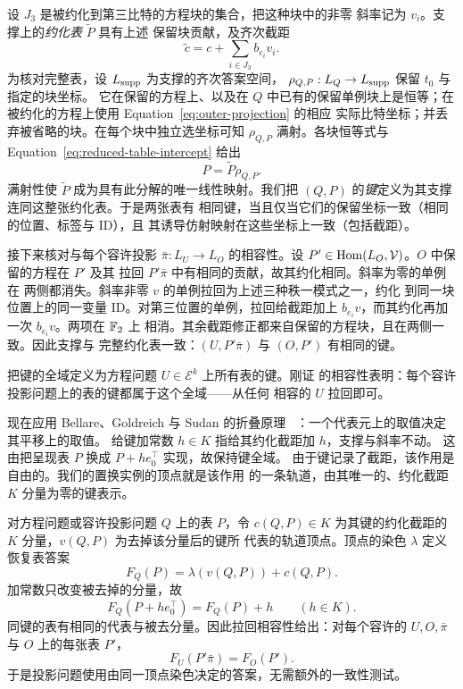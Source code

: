 设 \(J_3\) 是被约化到第三比特的方程块的集合，把这种块中的非零
斜率记为 \(v_i\)。支撑上的\emph{约化表} \(\widetilde P\) 具有上述
保留块贡献，及齐次截距
\begin{equation}
 \widetilde c=c+\sum_{i\in J_3} b_{e_i}v_i.
 \label{eq:reduced-table-intercept}
\end{equation}
为核对完整表，设 \(L_{\rm supp}\) 为支撑的齐次答案空间，
\(\rho_{Q,P}:L_Q\to L_{\rm supp}\) 保留 \(t_0\) 与指定的块坐标。
它在保留的方程上、以及在 \(Q\) 中已有的保留单例块上是恒等；在
被约化的方程上使用 Equation~\eqref{eq:outer-projection} 的相应
实际比特坐标；并丢弃被省略的块。在每个块中独立选坐标可知
\(\rho_{Q,P}\) 满射。各块恒等式与
Equation~\eqref{eq:reduced-table-intercept} 给出
\[
 P=\widetilde P\rho_{Q,P}.
\]
满射性使 \(\widetilde P\) 成为具有此分解的唯一线性映射。我们把
\((Q,P)\) 的\emph{键}定义为其支撑连同这整张约化表。于是两张表有
相同键，当且仅当它们的保留坐标一致（相同的位置、标签与 ID），且
其诱导仿射映射在这些坐标上一致（包括截距）。

接下来核对与每个容许投影 \(\bar\pi:L_U\to L_O\) 的相容性。设
\(P'\in\operatorname{Hom}(L_O,\mathcal V)\)。\(O\) 中保留的方程在 \(P'\) 及其
拉回 \(P'\bar\pi\) 中有相同的贡献，故其约化相同。斜率为零的单例在
两侧都消失。斜率非零 \(v\) 的单例拉回为上述三种秩一模式之一，约化
到同一块位置上的同一变量 ID。对第三位置的单例，拉回给截距加上
\(b_{e_i}v\)，而其约化再加一次 \(b_{e_i}v\)。两项在 \(\mathbb F_2\) 上
相消。其余截距修正都来自保留的方程块，且在两侧一致。因此支撑与
完整约化表一致：\((U,P'\bar\pi)\) 与 \((O,P')\) 有相同的键。

把键的全域定义为方程问题 \(U\in\mathcal E^k\) 上所有表的键。刚证
的相容性表明：每个容许投影问题上的表的键都属于这个全域——从任何
相容的 \(U\) 拉回即可。

现在应用 Bellare、Goldreich 与 Sudan 的折叠原理
~\cite[Section~3.3]{BGS98}：一个代表元上的取值决定其平移上的取值。
给键加常数 \(h\in K\) 指给其约化截距加 \(h\)，支撑与斜率不动。
这由把呈现表 \(P\) 换成 \(P+h e_0^\top\) 实现，故保持键全域。
由于键记录了截距，该作用是自由的。我们的置换实例的顶点就是该作用
的一条轨道，由其唯一的、约化截距 \(K\) 分量为零的键表示。

对方程问题或容许投影问题 \(Q\) 上的表 \(P\)，令 \(c(Q,P)\in K\)
为其键的约化截距的 \(K\) 分量，\(v(Q,P)\) 为去掉该分量后的键所
代表的轨道顶点。顶点的染色 \(\lambda\) 定义恢复表答案
\[
 F_Q(P)=\lambda(v(Q,P))+c(Q,P).
\]
加常数只改变被去掉的分量，故
\begin{equation}
 F_Q(P+h e_0^\top)=F_Q(P)+h
 \qquad(h\in K).
 \label{eq:table-folding}
\end{equation}
同键的表有相同的代表与被去分量。因此拉回相容性给出：对每个容许的
\(U,O,\bar\pi\) 与 \(O\) 上的每张表 \(P'\)，
\begin{equation}
 F_U(P'\bar\pi)=F_O(P').
 \label{eq:key-sharing}
\end{equation}
于是投影问题使用由同一顶点染色决定的答案，无需额外的一致性测试。


